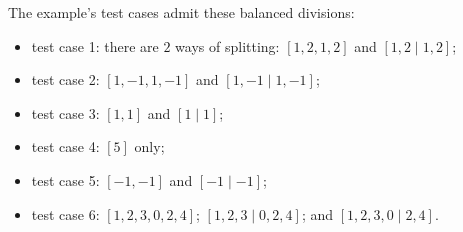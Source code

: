 The example's test cases admit these balanced divisions:

\begin{itemize}
\item test case 1: there are $2$ ways of splitting: $[1, 2, 1, 2]$ and $[1, 2 \mid 1, 2]$;
\item test case 2: $[1, -1, 1, -1]$ and $[1, -1 \mid 1, -1]$;
\item test case 3: $[1, 1]$ and $[1 \mid 1]$;
\item test case 4: $[5]$ only;
\item test case 5: $[-1, -1]$ and $[-1 \mid -1]$;
\item test case 6: $[1, 2, 3, 0, 2, 4]$; $[1, 2, 3 \mid 0, 2, 4]$; and $[1, 2, 3, 0 \mid 2, 4]$.
\end{itemize}
